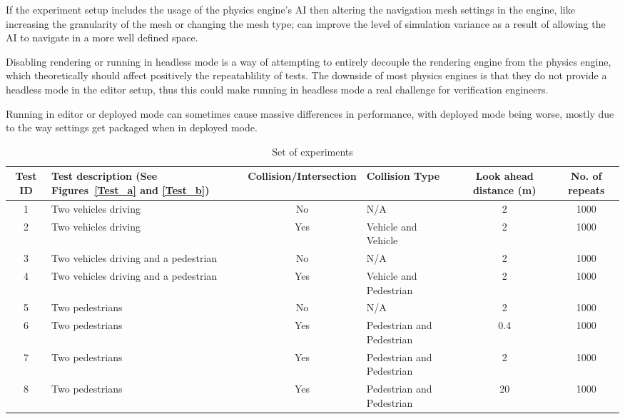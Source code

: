 If the experiment setup includes the usage of the physics engine's AI then altering the navigation mesh settings in the engine, like increasing the granularity of the mesh or changing the mesh type; can improve the level of simulation variance as a result of allowing the AI to navigate in a more well defined space. 

Disabling rendering or running in headless mode is a way of attempting to entirely decouple the rendering engine from the physics engine, which theoretically should affect positively the repeatablility of tests. 
The downside of most physics engines is that they do not provide a headless mode in the editor setup, thus this could make running in headless mode a real challenge for verification engineers.

Running in editor or deployed mode can sometimes cause massive differences in performance, with deployed mode being worse, mostly due to the way settings get packaged when in deployed mode.

\begin{table*}[b]
\centering
\begin{tabular}{clclcc}
\toprule
Test ID & Test description (See Figures~\ref{Test_a} and \ref{Test_b}) & Collision/Intersection & Collision Type & Look ahead distance (m) & No. of repeats \\ \midrule
1       & Two vehicles driving                   & No  & N/A & 2 & 1000 \\
2       & Two vehicles driving                   & Yes & Vehicle and Vehicle & 2 & 1000 \\
3       & Two vehicles driving and a pedestrian  & No  & N/A & 2 & 1000 \\
4       & Two vehicles driving and a pedestrian  & Yes & Vehicle and Pedestrian & 2 & 1000 \\
5       & Two pedestrians                        & No  & N/A & 2 & 1000 \\
6       & Two pedestrians                        & Yes & Pedestrian and Pedestrian & 0.4 & 1000 \\
7       & Two pedestrians                        & Yes & Pedestrian and Pedestrian & 2 & 1000 \\
8       & Two pedestrians                        & Yes & Pedestrian and Pedestrian & 20 & 1000 \\
\bottomrule
\end{tabular}
\caption{Set of experiments}
\label{TableOfExperiments}
\end{table*}

